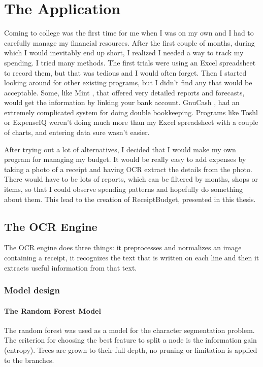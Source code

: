 \chapter{The Application}
\label{chap:application}

Coming to college was the first time for me when I was on my own and I had to carefully manage my financial resources. After the first couple of months, during which I would inevitably end up short, I realized I needed a way to track my spending. I tried many methods. The first trials were using an Excel spreadsheet to record them, but that was tedious and I would often forget. Then I started looking around for other existing programs, but I didn't find any that would be acceptable. Some, like Mint \cite{mint}, that offered very detailed reports and forecasts, would get the information by linking your bank account. GnuCash \cite{gnucash}, had an extremely complicated system for doing double bookkeeping. Programs like Toshl \cite{toshl} or ExpenseIQ \cite{expenseiq} weren't doing much more than my Excel spreadsheet with a couple of charts, and entering data sure wasn't easier. 

After trying out a lot of alternatives, I decided that I would make my own program for managing my budget. It would be really easy to add expenses by taking a photo of a receipt and having OCR extract the details from the photo. There would have to be lots of reports, which can be filtered by months, shops or items, so that I could observe spending patterns and hopefully do something about them. This lead to the creation of ReceiptBudget, presented in this thesis. 

\section{The OCR Engine}
The OCR engine does three things: it preprocesses and normalizes an image containing a receipt, it recognizes the text that is written on each line and then it extracts useful information from that text. 

\subsection{Model design}

\subsubsection{The Random Forest Model}
The random forest was used as a model for the character segmentation problem. The criterion for choosing the best feature to split a node is the information gain (entropy). Trees are grown to their full depth, no pruning or limitation is applied to the branches. 

